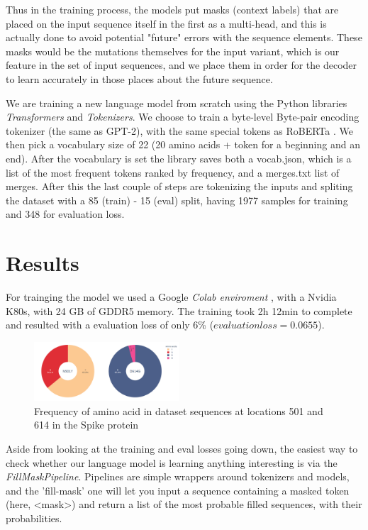 \documentclass[conference,compsoc]{IEEEtran}
\begin{document}
Thus in the training process, the models put masks (context labels) that are placed on the input sequence itself in the first as a multi-head, and this is actually done to avoid potential "future" errors with the sequence elements.
These masks would be the mutations themselves for the input variant, which is our feature in the set of input sequences, and we place them in order for the decoder to learn accurately in those places about the future sequence.

We are training a new language model from scratch using the Python libraries \textit{Transformers} and \textit{Tokenizers}. We choose to train a byte-level Byte-pair encoding tokenizer (the same as GPT-2), with the same special tokens as RoBERTa \cite{ref25}. We then pick a vocabulary size of 22 (20 amino acids + token for a beginning and an end). After the vocabulary is set the library saves both a vocab.json, which is a list of the most frequent tokens ranked by frequency, and a merges.txt list of merges. After this the last couple of steps are tokenizing the inputs and spliting the dataset with a  85 (train) - 15 (eval) split, having 1977 samples for training and 348 for evaluation loss. 

\section{Results}
For trainging the model we used a Google \textit{Colab enviroment} \cite{ref26}, with a Nvidia K80s, with 24 GB of GDDR5 memory. The training took 2h 12min
to complete and resulted with a evaluation loss of only 6\% ($evaluation loss=0.0655$). 

\begin{figure}[h]
    \centering
    \includegraphics[width=0.48\textwidth]{images/fig9-freq_mutations.png}
    \caption{Frequency of amino acid in dataset sequences at locations 501 and 614 in the Spike protein}
    \label{fig9}
\end{figure}


Aside from looking at the training and eval losses going down, the easiest way to check whether our language model is learning anything interesting is via the \textit{FillMaskPipeline}. Pipelines are simple wrappers around tokenizers and models, and the 'fill-mask' one will let you input a sequence containing a masked token (here, <mask>) and return a list of the most probable filled sequences, with their probabilities. 
\end{document}
